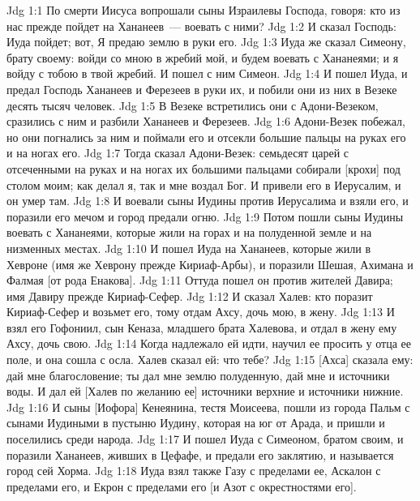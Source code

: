 \vs Jdg 1:1 По смерти Иисуса вопрошали сыны Израилевы Господа, говоря: кто из нас прежде пойдет на Хананеев~--- воевать с ними?
\vs Jdg 1:2 И сказал Господь: Иуда пойдет; вот, Я предаю землю в руки его.
\vs Jdg 1:3 Иуда же сказал Симеону, брату своему: войди со мною в жребий мой, и будем воевать с Хананеями; и я войду с тобою в твой жребий. И пошел с ним Симеон.
\vs Jdg 1:4 И пошел Иуда, и предал Господь Хананеев и Ферезеев в руки их, и побили они из них в Везеке десять тысяч человек.
\vs Jdg 1:5 В Везеке встретились они с Адони-Везеком, сразились с ним и разбили Хананеев и Ферезеев.
\vs Jdg 1:6 Адони-Везек побежал, но они погнались за ним и поймали его и отсекли большие пальцы на руках его и на ногах его.
\vs Jdg 1:7 Тогда сказал Адони-Везек: семьдесят царей с отсеченными на руках и на ногах их большими пальцами собирали [крохи] под столом моим; как делал я, так и мне воздал Бог. И привели его в Иерусалим, и он умер там.
\vs Jdg 1:8 И воевали сыны Иудины против Иерусалима и взяли его, и поразили его мечом и город предали огню.
\vs Jdg 1:9 Потом пошли сыны Иудины воевать с Хананеями, которые жили на горах и на полуденной земле и на низменных местах.
\vs Jdg 1:10 И пошел Иуда на Хананеев, которые жили в Хевроне (имя же Хеврону  прежде Кириаф-Арбы), и поразили Шешая, Ахимана и Фалмая [от рода Енакова].
\vs Jdg 1:11 Оттуда пошел он против жителей Давира; имя Давиру  прежде Кириаф-Сефер.
\vs Jdg 1:12 И сказал Халев: кто поразит Кириаф-Сефер и возьмет его, тому отдам Ахсу, дочь мою, в жену.
\vs Jdg 1:13 И взял его Гофониил, сын Кеназа, младшего брата Халевова, и  отдал в жену ему Ахсу, дочь свою.
\vs Jdg 1:14 Когда надлежало ей идти,  научил ее просить у отца ее поле, и она сошла с осла. Халев сказал ей: что тебе?
\vs Jdg 1:15 [Ахса] сказала ему: дай мне благословение; ты дал мне землю полуденную, дай мне и источники воды. И дал ей [Халев по желанию ее] источники верхние и источники нижние.
\vs Jdg 1:16 И сыны [Иофора] Кенеянина, тестя Моисеева, пошли из города Пальм с сынами Иудиными в пустыню Иудину, которая на юг от Арада, и пришли и поселились среди народа.
\vs Jdg 1:17 И пошел Иуда с Симеоном, братом своим, и поразили Хананеев, живших в Цефафе, и предали его заклятию, и  называется город сей Хорма.
\vs Jdg 1:18 Иуда взял также Газу с пределами ее, Аскалон с пределами его, и Екрон с пределами его [и Азот с окрестностями его].

